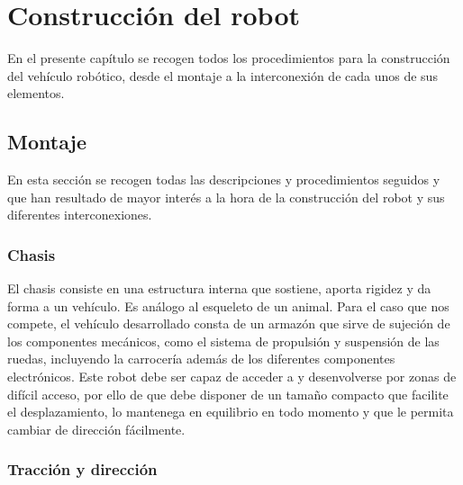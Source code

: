 

\newpage

\chapter{Construcción del robot}
\label{chap:montaje}


En el presente capítulo se recogen todos los procedimientos para la construcción del vehículo robótico, desde el montaje a la interconexión de cada unos de sus elementos.\\

\section{Montaje}

En esta sección se recogen todas las descripciones y procedimientos seguidos y que han resultado de mayor interés a la hora de la construcción del robot y 
sus diferentes interconexiones.\\

\subsection{Chasis}

El chasis consiste en una estructura interna que sostiene, aporta rigidez y da forma a un vehículo. Es análogo al esqueleto de un animal.
Para el caso que nos compete, el vehículo desarrollado consta de un armazón​ que sirve de sujeción de los componentes mecánicos, como el sistema de propulsión y suspensión de las
ruedas, incluyendo la carrocería además de los diferentes componentes electrónicos.​ Este robot debe ser capaz de acceder a y desenvolverse por zonas de difícil acceso, por ello de
que debe disponer de un tamaño compacto que facilite el desplazamiento, lo mantenega en equilibrio en todo momento y que le permita cambiar de dirección fácilmente.\\

\subsection{Tracción y dirección}

